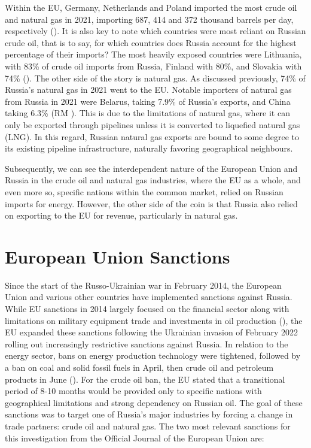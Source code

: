 \documentclass[12pt]{article}
\begin{document}
Within the EU, Germany, Netherlands and Poland imported the most crude oil and natural gas in 2021, importing 687, 414 and 372 thousand barrels per day, respectively (\citeauthor{reuters_2022}). It is also key to note which countries were most reliant on Russian crude oil, that is to say, for which countries does Russia account for the highest percentage of their imports? The most heavily exposed countries were Lithuania, with 83\% of crude oil imports from Russia, Finland with 80\%, and Slovakia with 74\% (\cite{reuters_2022}). The other side of the story is natural gas. As discussed previously, 74\% of Russia's natural gas in 2021 went to the EU. Notable importers of natural gas from Russia in 2021 were Belarus, taking 7.9\% of Russia's exports, and China taking 6.3\% (RM \citeauthor{rm_staff_2022}). This is due to the limitations of natural gas, where it can only be exported through pipelines unless it is converted to liquefied natural gas (LNG). In this regard, Russian natural gas exports are bound to some degree to its existing pipeline infrastructure, naturally favoring geographical neighbours.

Subsequently, we can see the interdependent nature of the European Union and Russia in the crude oil and natural gas industries, where the EU as a whole, and even more so, specific nations within the common market, relied on Russian imports for energy. However, the other side of the coin is that Russia also relied on exporting to the EU for revenue, particularly in natural gas.  
  
\section{European Union Sanctions}

Since the start of the Russo-Ukrainian war in February 2014, the European Union and various other countries have implemented sanctions against Russia. While EU sanctions in 2014 largely focused on the financial sector along with limitations on military equipment trade and investments in oil production (\citeauthor{the_council_of_the_european_union_2014}), the EU expanded these sanctions following the Ukrainian invasion of February 2022 rolling out increasingly restrictive sanctions against Russia. In relation to the energy sector, bans on energy production technology were tightened, followed by a ban on coal and solid fossil fuels in April, then crude oil and petroleum products in June (\citeauthor{dete_2022}). For the crude oil ban, the EU stated that a transitional period of 8-10 months would be provided only to specific nations with geographical limitations and strong dependency on Russian oil. The goal of these sanctions was to target one of Russia's major industries by forcing a change in trade partners: crude oil and natural gas. The two most relevant sanctions for this investigation from the Official Journal of the European Union are:
\end{document}

